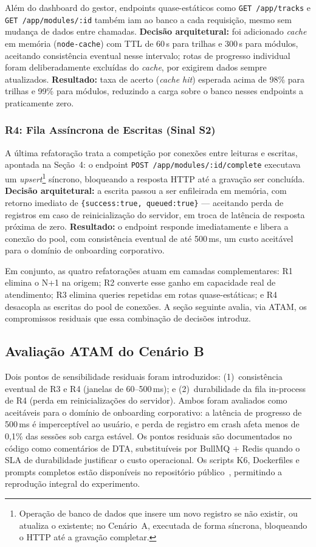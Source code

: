 \documentclass[sigconf]{acmart}
\begin{document}
Além do dashboard do gestor, endpoints quase-estáticos como \texttt{GET /app/tracks} e \texttt{GET /app/modules/:id} também iam ao banco a cada requisição, mesmo sem mudança de dados entre chamadas. \textbf{Decisão arquitetural:} foi adicionado \textit{cache} em memória (\texttt{node-cache}) com TTL de 60\,s para trilhas e 300\,s para módulos, aceitando consistência eventual nesse intervalo; rotas de progresso individual foram deliberadamente excluídas do \textit{cache}, por exigirem dados sempre atualizados. \textbf{Resultado:} taxa de acerto (\textit{cache hit}) esperada acima de 98\% para trilhas e 99\% para módulos, reduzindo a carga sobre o banco nesses endpoints a praticamente zero.

\subsubsection{R4: Fila Assíncrona de Escritas (Sinal S2)}

A última refatoração trata a competição por conexões entre leituras e escritas, apontada na Seção~4: o endpoint \texttt{POST /app/modules/:id/complete} executava um \textit{upsert}\footnote{Operação de banco de dados que insere um novo registro se não existir, ou atualiza o existente; no Cenário~A, executada de forma síncrona, bloqueando o HTTP até a gravação completar.} síncrono, bloqueando a resposta HTTP até a gravação ser concluída. \textbf{Decisão arquitetural:} a escrita passou a ser enfileirada em memória, com retorno imediato de \texttt{\{success:true, queued:true\}} — aceitando perda de registros em caso de reinicialização do servidor, em troca de latência de resposta próxima de zero. \textbf{Resultado:} o endpoint responde imediatamente e libera a conexão do pool, com consistência eventual de até 500\,ms, um custo aceitável para o domínio de onboarding corporativo.

Em conjunto, as quatro refatorações atuam em camadas complementares: R1 elimina o N+1 na origem; R2 converte esse ganho em capacidade real de atendimento; R3 elimina queries repetidas em rotas quase-estáticas; e R4 desacopla as escritas do pool de conexões. A seção seguinte avalia, via ATAM, os compromissos residuais que essa combinação de decisões introduz.

\subsection{Avaliação ATAM do Cenário B}

Dois pontos de sensibilidade residuais foram introduzidos: (1)~consistência eventual
de R3 e R4 (janelas de 60--500\,ms); e (2)~durabilidade da fila in-process de R4
(perda em reinicializações do servidor). Ambos foram avaliados como aceitáveis para
o domínio de onboarding corporativo: a latência de progresso de 500\,ms é
imperceptível ao usuário, e perda de registro em crash afeta menos de 0,1\% das
sessões sob carga estável. Os pontos residuais são documentados no código como
comentários de DTA, substituíveis por BullMQ + Redis quando o SLA de durabilidade
justificar o custo operacional. Os scripts K6, Dockerfiles e prompts completos estão
disponíveis no repositório público~\cite{GenAIDebt2026}, permitindo a
reprodução integral do experimento.
\end{document}
